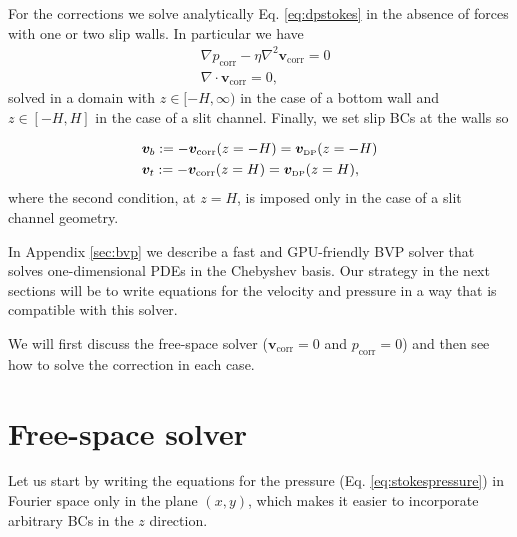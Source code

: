 \documentclass[ twoside,openright,titlepage,numbers=noenddot,%
headinclude,footinclude,cleardoublepage=empty,abstract=on,
BCOR=5mm,paper=b5,fontsize=11pt, dvipsnames
]{scrreprt}
\renewcommand{\vec}[1]{\bm{#1}}
\newcommand{\gpu}{\gls{GPU}\xspace}
\newcommand{\fvel}{v}
\newcommand{\corr}{\text{corr}}
\newcommand{\dpr}{\text{\tiny DP}}
\begin{document}
For the corrections we solve analytically Eq. \eqref{eq:dpstokes} in the absence of forces with one or two slip walls. In particular we have
\begin{equation}
  \label{eq:dpstokescorr}
\begin{aligned}
    &\nabla p_{\corr} - \eta\nabla^2\vec{\fvel}_{\corr} = 0\\
    &\nabla\cdot\vec{\fvel}_{\corr} = 0,
\end{aligned}
\end{equation}
solved in a domain with $z\in [-H,\infty)$ in the case of a bottom wall and $z\in [-H, H]$ in the case of a slit channel. Finally, we set slip \glspl{BC} at the walls so

\begin{equation}
  \label{eq:dpstokescorrbcs}
  \begin{aligned}
    &\vec{\fvel}_b:=-\vec{\fvel}_{\corr}(z=-H) = \vec{\fvel}_{\dpr}(z=-H)\\
    &\vec{\fvel}_t:=-\vec{\fvel}_{\corr}(z=H) = \vec{\fvel}_{\dpr}(z=H),
\end{aligned}
\end{equation}
where the second condition, at $z=H$, is imposed only in the case of a slit channel geometry.

In Appendix \ref{sec:bvp} we describe a fast and \gpu-friendly \gls{BVP} solver that solves one-dimensional \glspl{PDE} in the Chebyshev basis. Our strategy in the next sections will be to write equations for the velocity and pressure in a way that is compatible with this solver. 

We will first discuss the free-space solver ($\vec{\fvel}_{\corr} = 0$ and $p_\corr=0$) and then see how to solve the correction in each case. 
\section{Free-space solver}
Let us start by writing the equations for the pressure (Eq. \eqref{eq:stokespressure}) in Fourier space only in the plane $(x,y)$, which makes it easier to incorporate arbitrary \glspl{BC} in the $z$ direction.
\end{document}
